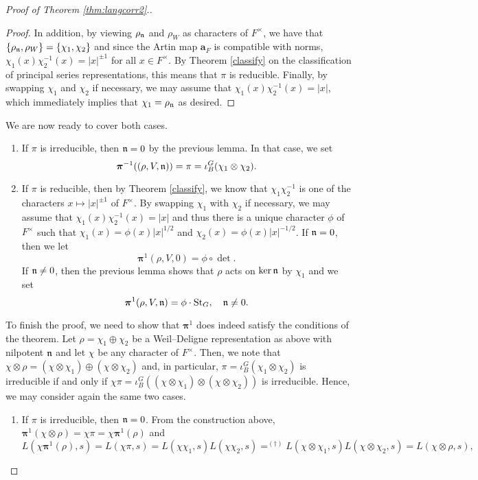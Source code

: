 \begin{proof}[Proof of Theorem \ref{thm:langcorr2}.]
\begin{proof}
        In addition, by viewing $\rho_{\mathfrak{n}}$ and $\rho_W$ as characters of $F^\times$, we have that $\{\rho_{\mathfrak{n}},\rho_W\}=\{\chi_1,\chi_2\}$ and since the Artin map $\bm{a}_F$ is compatible with norms, $\chi_1(x)\chi_2^{-1}(x)=|x|^{\pm1}$ for all $x\in F^\times$. By Theorem \ref{classify} on the classification of principal series representations, this means that $\pi$ is reducible. Finally, by swapping $\chi_1$ and $\chi_2$ if necessary, we may assume that $\chi_1(x)\chi_2^{-1}(x)=|x|$, which immediately implies that $\chi_1=\rho_{\mathfrak{n}}$ as desired.
    \end{proof}
    We are now ready to cover both cases.
    \begin{enumerate}[(1)]
        \item If $\pi$ is irreducible, then $\mathfrak{n}=0$ by the previous lemma. In that case, we set 
        $$\bm\pi^{-1}((\rho,V,\mathfrak{n}))=\pi=\iota_B^G(\chi_1\otimes\chi_2).$$
        \item If $\pi$ is reducible, then by Theorem \ref{classify}, we know that $\chi_1\chi_2^{-1}$ is one of the characters $x\mapsto|x|^{\pm1}$ of $F^\times$. By swapping $\chi_1$ with $\chi_2$ if necessary, we may assume that $\chi_1(x)\chi_2^{-1}(x)=|x|$ and thus there is a unique character $\phi$ of $F^\times$ such that $\chi_1(x)=\phi(x)|x|^{1/2}$ and $\chi_2(x)=\phi(x)|x|^{-1/2}$. If $\mathfrak{n}=0$, then we let 
        $$\bm\pi^1(\rho,V,0)=\phi\circ\det.$$
        If $\mathfrak{n}\neq0$, then the previous lemma shows that $\rho$ acts on $\ker\mathfrak{n}$ by $\chi_1$ and we set 
        $$\bm\pi^1(\rho,V,\mathfrak{n})=\phi\cdot\mathrm{St}_G,\quad \mathfrak{n}\neq0.$$
    \end{enumerate}
    To finish the proof, we need to show that $\bm\pi^1$ does indeed satisfy the conditions of the theorem. Let $\rho=\chi_1\oplus\chi_2$ be a Weil--Deligne representation as above with nilpotent $\mathfrak{n}$ and let $\chi$ be any character of $F^\times$. Then, we note that $\chi\otimes\rho=(\chi\otimes\chi_1)\oplus(\chi\otimes\chi_2)$ and, in particular, $\pi=\iota_B^G(\chi_1\otimes\chi_2)$ is irreducible if and only if $\chi\pi=\iota_B^G((\chi\otimes\chi_1)\otimes(\chi\otimes\chi_2))$ is irreducible. Hence, we may consider again the same two cases.
    \begin{enumerate}[(1)]
        \item If $\pi$ is irreducible, then $\mathfrak{n}=0$. From the construction above, $\bm\pi^1(\chi\otimes\rho)=\chi\pi=\chi\bm\pi^1(\rho)$ and
        $$L(\chi\bm\pi^1(\rho),s)=L(\chi\pi,s)=L(\chi\chi_1,s)L(\chi\chi_2,s)=^{(\dagger)}L(\chi\otimes\chi_1,s)L(\chi\otimes\chi_2,s)=L(\chi\otimes\rho,s),$$

\end{enumerate}
\end{proof}
